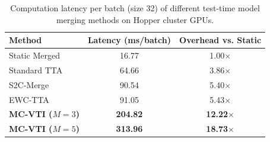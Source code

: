 \documentclass{article}
\theoremstyle{plain}
\theoremstyle{definition}
\theoremstyle{remark}
\begin{document}
\begin{table}[ht]
  \caption{Computation latency per batch (size 32) of different test-time model merging methods on Hopper cluster GPUs.}
  \label{tab:method_latency}
  \vskip 0.15in
  \begin{center}
  \begin{small}
  \begin{sc}
  \begin{tabular}{lcc}
    \toprule
    Method & Latency (ms/batch) & Overhead vs. Static \\
    \midrule
    Static Merged  & 16.77 & 1.00$\times$ \\
    Standard TTA   & 64.66 & 3.86$\times$ \\
    S2C-Merge      & 90.54 & 5.40$\times$ \\
    EWC-TTA        & 91.05 & 5.43$\times$ \\
    \textbf{MC-VTI ($M=3$)} & \textbf{204.82} & \textbf{12.22$\times$} \\
    \textbf{MC-VTI ($M=5$)} & \textbf{313.96} & \textbf{18.73$\times$} \\
    \bottomrule
  \end{tabular}
  \end{sc}
  \end{small}
  \end{center}
  \vskip -0.1in
\end{table}
\end{document}
